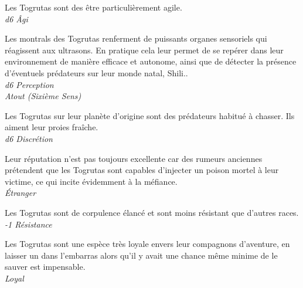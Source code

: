 \begin{description}[align=left]
\item [Agilité] 				%
		Les Togrutas sont des être particulièrement agile.\\
		\textit{d6 \^Agi}

\item [Montrals] 				%
		Les montrals des Togrutas renferment de puissants organes sensoriels qui réagissent aux ultrasons. En pratique cela leur permet de se repérer dans leur environnement de manière efficace et autonome, ainsi que de détecter la présence d’éventuels prédateurs sur leur monde natal, Shili..\\
		\textit{d6 Perception}\\
		\textit{Atout (Sixième Sens)}

\item [Prédateur né] 			%
		Les Togrutas sur leur planète d’origine sont des prédateurs habitué à chasser. Ils aiment leur proies fraîche.\\
		\textit{d6 Discrétion}

\item [Mauvaise réputation] 	%
		Leur réputation n’est pas toujours excellente car des rumeurs anciennes prétendent que les Togrutas sont capables d’injecter un poison mortel à leur victime, ce qui incite évidemment à la méfiance.\\
		\textit{\'Etranger}

\item [Frêle] 					%
		Les Togrutas sont de corpulence élancé et sont moins résistant que d’autres races.\\
		\textit{-1 Résistance}

\item [Un pour tous] 			%
		Les Togrutas sont une espèce très loyale envers leur compagnons d’aventure, en laisser un dans l’embarras alors qu’il y avait une chance même minime de le sauver est impensable.\\
		\textit{Loyal}
\end{description}